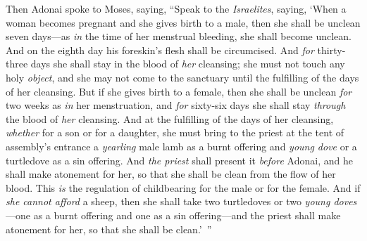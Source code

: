 \begin{biblechapter} %
 Then Adonai spoke to Moses, saying,
\verse “Speak to the \textit{Israelites}, saying, ‘When a woman becomes pregnant and she gives birth to a male, then she shall be unclean seven days—as \textit{in} the time of her menstrual bleeding, she shall become unclean.
\verse And on the eighth day his foreskin’s flesh shall be circumcised.
\verse And \textit{for} thirty-three days she shall stay in the blood of \textit{her} cleansing; she must not touch any holy \textit{object}, and she may not come to the sanctuary until the fulfilling of the days of her cleansing.
\verse But if she gives birth to a female, then she shall be unclean \textit{for} two weeks as \textit{in} her menstruation, and \textit{for} sixty-six days she shall stay \textit{through} the blood of \textit{her} cleansing.
\verse And at the fulfilling of the days of her cleansing, \textit{whether} for a son or for a daughter, she must bring to the priest at the tent of assembly’s entrance a \textit{yearling} male lamb as a burnt offering and \textit{young dove} or a turtledove as a sin offering.
\verse And \textit{the priest} shall present it \textit{before} Adonai, and he shall make atonement for her, so that she shall be clean from the flow of her blood. This \textit{is} the regulation of childbearing for the male or for the female.
\verse And if \textit{she cannot afford} a sheep, then she shall take two turtledoves or two \textit{young doves}—one as a burnt offering and one as a sin offering—and the priest shall make atonement for her, so that she shall be clean.’ ”
\end{biblechapter}

